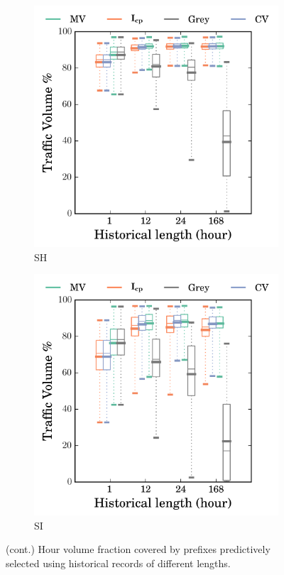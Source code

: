 \begin{figure}
\begin{subfigure}[b]{0.48\textwidth}
                \includegraphics[width=\textwidth]{gfx/chap2/grey_cvg_box_method_compare_fs_sh.png}
                \caption{SH}
                \label{fig:cvg_sh}
        \end{subfigure}
        \begin{subfigure}[b]{0.48\textwidth}
                \includegraphics[width=\textwidth]{gfx/chap2/grey_cvg_box_method_compare_fs_si.png}
                \caption{SI}
                \label{fig:cvg_si}
        \end{subfigure}
\caption{(cont.) Hour volume fraction covered by prefixes predictively selected using historical records of different lengths.}
\label{fig:cvg_cont}
\end{figure}

